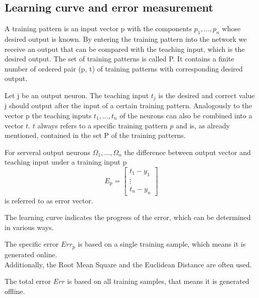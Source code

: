 \subsection{Learning curve and error measurement}
\begin{definition}
    A training pattern is an input vector p with the components $p_{1}, \ldots,p_{n}$ whose desired output is known. By entering the training pattern into the network we receive an output that can be compared with the teaching input, which is the desired output. The set of training patterns is called P. It contains a finite number of ordered pair (p, t) of training patterns with corresponding desired output.
\end{definition}
\begin{definition}
    Let j be an output neuron. The teaching input $t_j$ is the desired and correct value j should output after the input of a certain training pattern. Analogously to the vector p the teaching inputs $t_{1}, \ldots,t_{n}$ of the neurons can also be combined into a vector $t$. $t$ always refers to a specific training pattern $p$ and is, as already mentioned, contained in the set P of the training patterns.
\end{definition}
\begin{definition}
    For serveral output neurons $\Omega_{1}, \ldots,\Omega_{n}$ the difference between output vector and teaching input under a training input p
    \[ 
        E_p = \begin{bmatrix}
            t_1-y_1 \\
            \vdots\\
            t_n-y_n
        \end{bmatrix} 
    \]is referred to as error vector. 
\end{definition}
The learning curve indicates the progress of the error, which can be determined in various ways.
\begin{definition}
    The specific error $Err_p$ is based on a single training sample, which means it is generated online.\\
    Additionally, the Root Mean Square and the Euclidean Distance are often used.
\end{definition}
\begin{definition}
    The total error $Err$ is based on all training samples, that means it is generated offline.
\end{definition}
